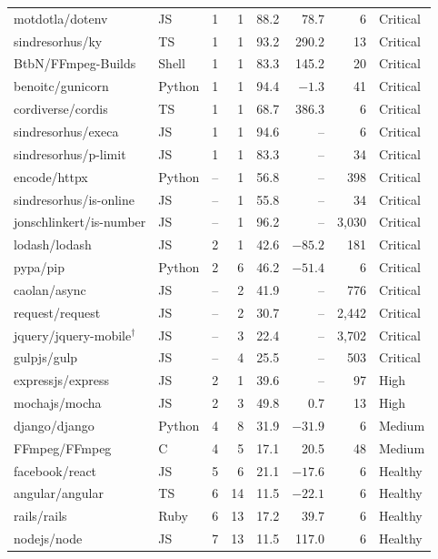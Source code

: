 \documentclass[11pt,a4paper]{report}
\newcommand{\risk}[1]{\textsf{\small #1}}
\begin{document}
\begin{small}
\begin{longtable}{l l r r r r r l}
motdotla/dotenv & JS & 1 & 1 & 88.2 & 78.7 & 6 & \risk{Critical} \\
sindresorhus/ky & TS & 1 & 1 & 93.2 & 290.2 & 13 & \risk{Critical} \\
BtbN/FFmpeg-Builds & Shell & 1 & 1 & 83.3 & 145.2 & 20 & \risk{Critical} \\
benoitc/gunicorn & Python & 1 & 1 & 94.4 & $-1.3$ & 41 & \risk{Critical} \\
cordiverse/cordis & TS & 1 & 1 & 68.7 & 386.3 & 6 & \risk{Critical} \\
sindresorhus/execa & JS & 1 & 1 & 94.6 & -- & 6 & \risk{Critical} \\
sindresorhus/p-limit & JS & 1 & 1 & 83.3 & -- & 34 & \risk{Critical} \\
encode/httpx & Python & -- & 1 & 56.8 & -- & 398 & \risk{Critical} \\
sindresorhus/is-online & JS & -- & 1 & 55.8 & -- & 34 & \risk{Critical} \\
jonschlinkert/is-number & JS & -- & 1 & 96.2 & -- & 3,030 & \risk{Critical} \\
lodash/lodash & JS & 2 & 1 & 42.6 & $-85.2$ & 181 & \risk{Critical} \\
pypa/pip & Python & 2 & 6 & 46.2 & $-51.4$ & 6 & \risk{Critical} \\
caolan/async & JS & -- & 2 & 41.9 & -- & 776 & \risk{Critical} \\
request/request & JS & -- & 2 & 30.7 & -- & 2,442 & \risk{Critical} \\
jquery/jquery-mobile$^{\dagger}$ & JS & -- & 3 & 22.4 & -- & 3,702 & \risk{Critical} \\
gulpjs/gulp & JS & -- & 4 & 25.5 & -- & 503 & \risk{Critical} \\
expressjs/express & JS & 2 & 1 & 39.6 & -- & 97 & \risk{High} \\
mochajs/mocha & JS & 2 & 3 & 49.8 & 0.7 & 13 & \risk{High} \\
django/django & Python & 4 & 8 & 31.9 & $-31.9$ & 6 & \risk{Medium} \\
FFmpeg/FFmpeg & C & 4 & 5 & 17.1 & 20.5 & 48 & \risk{Medium} \\
facebook/react & JS & 5 & 6 & 21.1 & $-17.6$ & 6 & \risk{Healthy} \\
angular/angular & TS & 6 & 14 & 11.5 & $-22.1$ & 6 & \risk{Healthy} \\
rails/rails & Ruby & 6 & 13 & 17.2 & 39.7 & 6 & \risk{Healthy} \\
nodejs/node & JS & 7 & 13 & 11.5 & 117.0 & 6 & \risk{Healthy} \\

\end{longtable}
\end{small}
\end{document}
